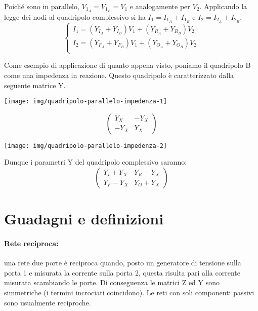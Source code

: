 Poiché sono in parallelo, $V_{1_A} = V_{1_B} = V_1$ e analogamente per $V_2$. Applicando la legge dei nodi al quadripolo complessivo si ha $I_1 = I_{1_A}+I_{1_B}$ e $I_2 = I_{2_A}+I_{2_B}$.
\[
\begin{cases}
I_1 = (Y_{I_A} + Y_{I_B}) V_1 + (Y_{R_A}+Y_{R_B})V_2\\
I_2 = (Y_{F_A} + Y_{F_B}) V_1 + (Y_{O_A}+Y_{O_B})V_2\\
\end{cases}
\]

Come esempio di applicazione di quanto appena visto, poniamo il quadripolo B come una impedenza in reazione. Questo quadripolo è caratterizzato dalla seguente matrice Y.

\begin{minipage}{.5\linewidth}
	\centering
	\texttt{[image: img/quadripolo-parallelo-impedenza-1]}
\end{minipage}
\begin{minipage}{.5\linewidth}
	\[
	\left(
	\begin{array}{cc}
	Y_X & -Y_X\\
	-Y_X& Y_X
	\end{array}
	\right)
	\]
\end{minipage}

\vspace{1em} %

\begin{minipage}{.5\linewidth}
	\centering
	\texttt{[image: img/quadripolo-parallelo-impedenza-2]}
\end{minipage}
\begin{minipage}{.5\linewidth}
	Dunque i parametri Y del quadripolo complessivo saranno:
	\[
	\left(
	\begin{array}{cc}
	Y_I +Y_X & Y_R -Y_X\\
	Y_F -Y_X & Y_O +Y_X
	\end{array}
	\right)
	\]
\end{minipage}


\section{Guadagni e definizioni}

\paragraph{Rete reciproca:} una rete due porte è reciproca quando, posto un generatore di tensione sulla porta 1 e misurata la corrente sulla porta 2, questa risulta pari alla corrente misurata scambiando le porte. Di conseguenza le matrici Z ed Y sono simmetriche (i termini incrociati coincidono). Le reti con soli componenti passivi sono usualmente reciproche.
